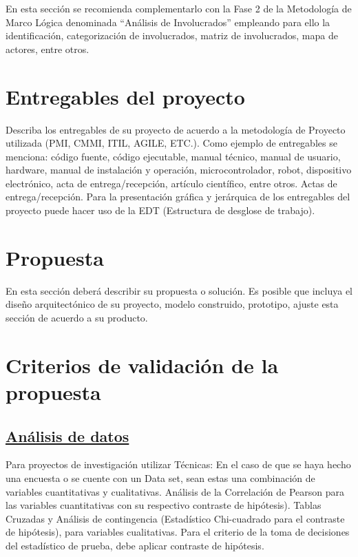 \documentclass[12pt, a4paper, nofontenc, numbers=endperiod]{apa7}
\begin{document}
{\setlength{\parindent}{1.27cm}En esta sección se recomienda complementarlo con la Fase 2 de la Metodología de Marco Lógica denominada “Análisis de Involucrados” empleando para ello la identificación, categorización de involucrados, matriz de involucrados, mapa de actores, entre otros.
		
\section*{\normalsize \centering Entregables del proyecto}

\setlength{\parindent}{1.27cm}Describa los entregables de su proyecto de acuerdo a la metodología de Proyecto utilizada (PMI, CMMI, ITIL, AGILE, ETC.). Como ejemplo de entregables se menciona: código fuente, código ejecutable, manual técnico, manual de usuario, hardware, manual de instalación y operación, microcontrolador, robot, dispositivo electrónico, acta de entrega/recepción, artículo científico, entre otros.
Actas de entrega/recepción. Para la presentación gráfica y jerárquica de los entregables del proyecto puede hacer uso de la EDT (Estructura de desglose de trabajo).
\newpage
\section{\normalsize \centering Propuesta}
En esta sección deberá describir su propuesta o solución. Es posible que incluya el diseño arquitectónico de su proyecto, modelo construido, prototipo, ajuste esta sección de acuerdo a su producto.

\section*{\normalsize \centering Criterios de validación de la propuesta}
\subsection*{\normalsize \underline{Análisis de datos}}
	
\setlength{\parindent}{1.27cm}	Para proyectos de investigación utilizar Técnicas: En el caso de que se haya hecho una encuesta o se cuente con un Data set, sean estas una combinación de variables cuantitativas y cualitativas. Análisis de la Correlación de Pearson para las variables cuantitativas con su respectivo contraste de hipótesis). Tablas Cruzadas y Análisis de contingencia (Estadístico Chi-cuadrado para el contraste de hipótesis), para variables cualitativas. Para el criterio de la toma de decisiones del estadístico de prueba, debe aplicar contraste de hipótesis.

}
\end{document}
